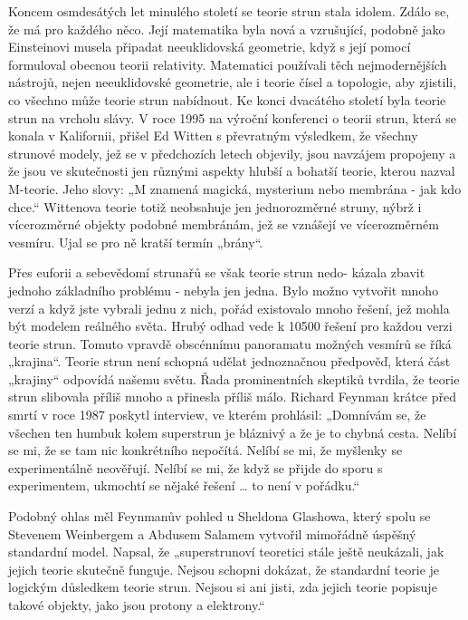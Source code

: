   Koncem osmdesátých let minulého století se teorie strun stala idolem. Zdálo se, že má pro každého
  něco. Její matematika byla nová a vzrušující, podobně jako Einsteinovi musela připadat
  neeuklidovská geometrie, když s její pomocí formuloval obecnou teorii relativity. Matematici
  používali těch nejmodernějších nástrojů, nejen neeuklidovské geometrie, ale i teorie čísel a
  topologie, aby zjistili, co všechno může teorie strun nabídnout. Ke konci dvacátého století byla
  teorie strun na vrcholu slávy. V roce 1995 na výroční konferenci o teorii strun, která se konala v
  Kalifornii, přišel Ed Witten s převratným výsledkem, že všechny strunové modely, jež se v
  předchozích letech objevily, jsou navzájem propojeny a že jsou ve skutečnosti jen různými aspekty
  hlubší a bohatší teorie, kterou nazval M-teorie. Jeho slovy: „M znamená magická, mysterium nebo
  membrána - jak kdo chce.“ Wittenova teorie totiž neobsahuje jen jednorozměrné struny, nýbrž i
  vícerozměrné objekty podobné membránám, jež se vznášejí ve vícerozměrném vesmíru. Ujal se pro ně
  kratší termín „brány“. 
  
  Přes euforii a sebevědomí strunařů se však teorie strun nedo- kázala zbavit jednoho základního
  problému - nebyla jen jedna. Bylo možno vytvořit mnoho verzí a když jste vybrali jednu z nich,
  pořád existovalo mnoho řešení, jež mohla být modelem reálného světa. Hrubý odhad vede k 10500
  řešení pro každou verzi teorie strun. Tomuto vpravdě obscénnímu panoramatu možných vesmírů se říká
  „krajina“. Teorie strun není schopná udělat jednoznačnou předpověď, která část „krajiny“ odpovídá
  našemu světu. Řada prominentních skeptiků tvrdila, že teorie strun slibovala příliš mnoho a
  přinesla příliš málo. Richard Feynman krátce před smrtí v roce 1987 poskytl interview, ve kterém
  prohlásil: „Domnívám se, že všechen ten humbuk kolem superstrun je bláznivý a že je to chybná
  cesta. Nelíbí se mi, že se tam nic konkrétního nepočítá. Nelíbí se mi, že myšlenky se
  experimentálně neověřují. Nelíbí se mi, že když se přijde do sporu s experimentem, ukmochtí se
  nějaké řešení … to není v pořádku.“
  
  Podobný ohlas měl Feynmanův pohled u Sheldona Glashowa, který spolu se Stevenem Weinbergem a
  Abdusem Salamem vytvořil mimořádně úspěšný standardní model. Napsal, že „superstrunoví teoretici
  stále ještě neukázali, jak jejich teorie skutečně funguje. Nejsou schopni dokázat, že standardní
  teorie je logickým důsledkem teorie strun. Nejsou si ani jisti, zda jejich teorie popisuje takové
  objekty, jako jsou protony a elektrony.“
  
